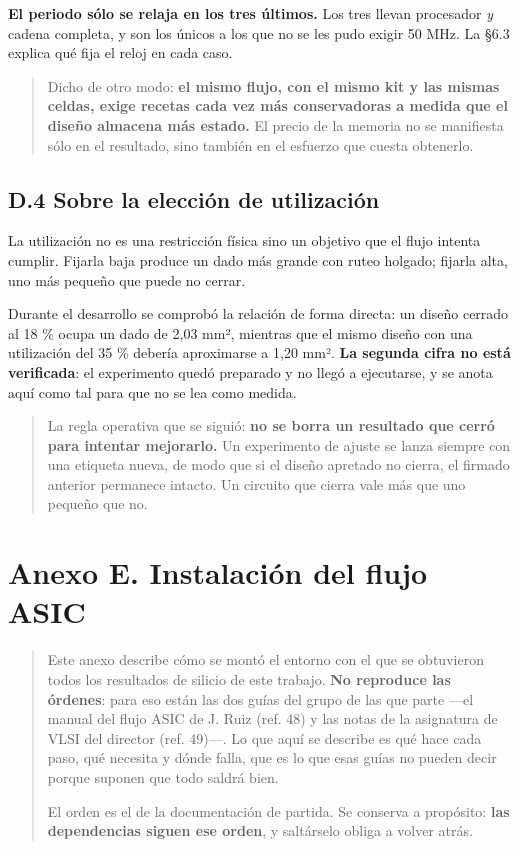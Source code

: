 \textbf{El periodo sólo se relaja en los tres últimos.} Los tres llevan
procesador \emph{y} cadena completa, y son los únicos a los que no se
les pudo exigir 50 MHz. La §6.3 explica qué fija el reloj en cada caso.

\begin{quote}
Dicho de otro modo: \textbf{el mismo flujo, con el mismo kit y las
mismas celdas, exige recetas cada vez más conservadoras a medida que el
diseño almacena más estado.} El precio de la memoria no se manifiesta
sólo en el resultado, sino también en el esfuerzo que cuesta obtenerlo.
\end{quote}

\subsection{D.4 Sobre la elección de
utilización}\label{d.4-sobre-la-elecciuxf3n-de-utilizaciuxf3n}

La utilización no es una restricción física sino un objetivo que el
flujo intenta cumplir. Fijarla baja produce un dado más grande con ruteo
holgado; fijarla alta, uno más pequeño que puede no cerrar.

Durante el desarrollo se comprobó la relación de forma directa: un
diseño cerrado al 18 \% ocupa un dado de 2,03 mm², mientras que el mismo
diseño con una utilización del 35 \% debería aproximarse a 1,20 mm².
\textbf{La segunda cifra no está verificada}: el experimento quedó
preparado y no llegó a ejecutarse, y se anota aquí como tal para que no
se lea como medida.

\begin{quote}
La regla operativa que se siguió: \textbf{no se borra un resultado que
cerró para intentar mejorarlo.} Un experimento de ajuste se lanza
siempre con una etiqueta nueva, de modo que si el diseño apretado no
cierra, el firmado anterior permanece intacto. Un circuito que cierra
vale más que uno pequeño que no.
\end{quote}

\section{Anexo E. Instalación del flujo
ASIC}\label{anexo-e.-instalaciuxf3n-del-flujo-asic}

\begin{quote}
Este anexo describe cómo se montó el entorno con el que se obtuvieron
todos los resultados de silicio de este trabajo. \textbf{No reproduce
las órdenes}: para eso están las dos guías del grupo de las que parte
---el manual del flujo ASIC de J. Ruiz (ref. 48) y las notas de la
asignatura de VLSI del director (ref. 49)---. Lo que aquí se describe es
qué hace cada paso, qué necesita y dónde falla, que es lo que esas guías
no pueden decir porque suponen que todo saldrá bien.

El orden es el de la documentación de partida. Se conserva a propósito:
\textbf{las dependencias siguen ese orden}, y saltárselo obliga a volver
atrás.
\end{quote}

